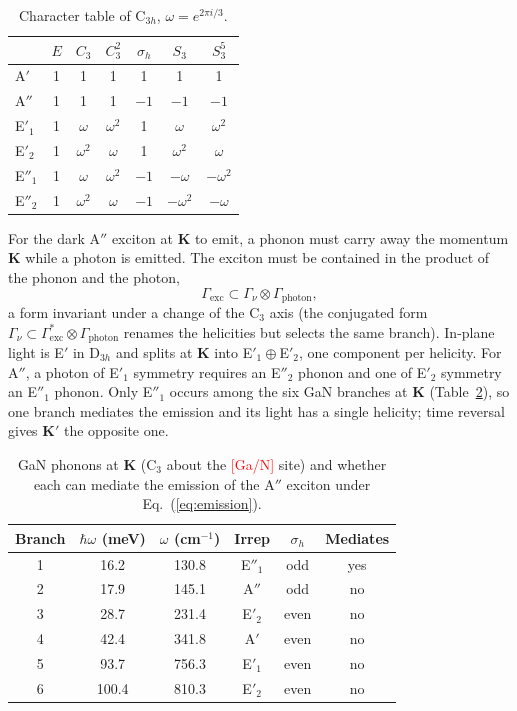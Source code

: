 \documentclass[10pt,a4paper]{article}
\newcommand{\tbd}[1]{\textcolor{red}{[#1]}}
\newcommand{\bK}{\mathbf{K}}
\begin{document}
\begin{table}[h]
\centering\small
\caption{Character table of C$_{3h}$, $\omega=e^{2\pi i/3}$.}
\label{tab:c3h}
\begin{tabular}{lcccccc}
\toprule
 & $E$ & $C_3$ & $C_3^2$ & $\sigma_h$ & $S_3$ & $S_3^5$\\
\midrule
A$'$ & 1 & 1 & 1 & 1 & 1 & 1\\
A$''$ & 1 & 1 & 1 & $-1$ & $-1$ & $-1$\\
E$'_1$ & 1 & $\omega$ & $\omega^2$ & 1 & $\omega$ & $\omega^2$\\
E$'_2$ & 1 & $\omega^2$ & $\omega$ & 1 & $\omega^2$ & $\omega$\\
E$''_1$ & 1 & $\omega$ & $\omega^2$ & $-1$ & $-\omega$ & $-\omega^2$\\
E$''_2$ & 1 & $\omega^2$ & $\omega$ & $-1$ & $-\omega^2$ & $-\omega$\\
\bottomrule
\end{tabular}
\end{table}

For the dark A$''$ exciton at $\bK$ to emit, a phonon must carry away the
momentum $\bK$ while a photon is emitted. The exciton must be contained in the
product of the phonon and the photon,
\begin{equation}
\Gamma_{\mathrm{exc}}\subset\Gamma_\nu\otimes\Gamma_{\mathrm{photon}},
\label{eq:emission}
\end{equation}
a form invariant under a change of the C$_3$ axis (the conjugated form
$\Gamma_\nu\subset\Gamma^*_{\mathrm{exc}}\otimes\Gamma_{\mathrm{photon}}$
renames the helicities but selects the same branch). In-plane light is E$'$ in
D$_{3h}$ and splits at $\bK$ into E$'_1\oplus$E$'_2$, one component per helicity.
For A$''$, a photon of E$'_1$ symmetry requires an E$''_2$ phonon and one of
E$'_2$ symmetry an E$''_1$ phonon. Only E$''_1$ occurs among the six GaN branches
at $\bK$ (Table~\ref{tab:phK}), so one branch mediates the emission and its light
has a single helicity; time reversal gives $\bK'$ the opposite one.

\begin{table}[h]
\centering\small
\caption{GaN phonons at $\bK$ (C$_3$ about the \tbd{Ga/N} site) and whether each
can mediate the emission of the A$''$ exciton under Eq.~(\ref{eq:emission}).}
\label{tab:phK}
\begin{tabular}{cccccc}
\toprule
Branch & $\hbar\omega$ (meV) & $\omega$ (cm$^{-1}$) & Irrep & $\sigma_h$ & Mediates\\
\midrule
1 & 16.2 & 130.8 & E$''_1$ & odd & yes\\
2 & 17.9 & 145.1 & A$''$ & odd & no\\
3 & 28.7 & 231.4 & E$'_2$ & even & no\\
4 & 42.4 & 341.8 & A$'$ & even & no\\
5 & 93.7 & 756.3 & E$'_1$ & even & no\\
6 & 100.4 & 810.3 & E$'_2$ & even & no\\
\bottomrule
\end{tabular}
\end{table}
\end{document}
